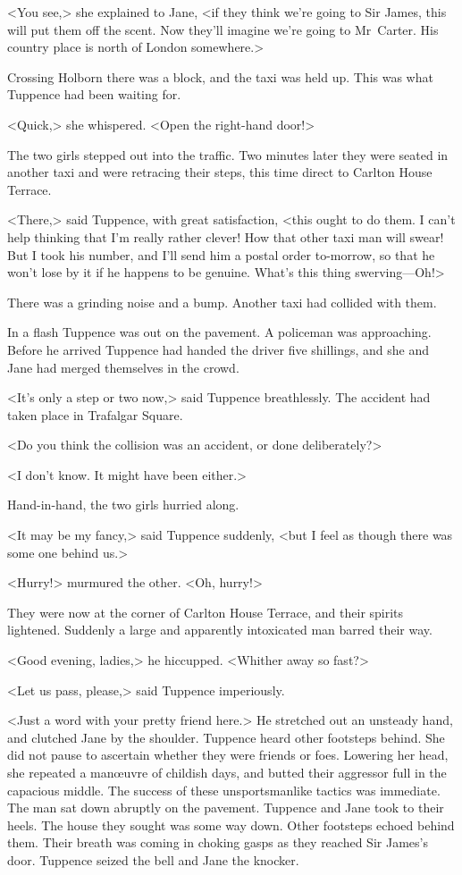 <You see,> she explained to Jane, <if they think we're going to Sir James, this will put them off the scent. Now they'll imagine we're going to Mr~Carter. His country place is north of London somewhere.>

Crossing Holborn there was a block, and the taxi was held up. This was what Tuppence had been waiting for.

<Quick,> she whispered. <Open the right-hand door!>

The two girls stepped out into the traffic. Two minutes later they were seated in another taxi and were retracing their steps, this time direct to Carlton House Terrace.

<There,> said Tuppence, with great satisfaction, <this ought to do them. I can't help thinking that I'm really rather clever! How that other taxi man will swear! But I took his number, and I'll send him a postal order to-morrow, so that he won't lose by it if he happens to be genuine. What's this thing swerving—Oh!>

There was a grinding noise and a bump. Another taxi had collided with them.

In a flash Tuppence was out on the pavement. A policeman was approaching. Before he arrived Tuppence had handed the driver five shillings, and she and Jane had merged themselves in the crowd.

<It's only a step or two now,> said Tuppence breathlessly. The accident had taken place in Trafalgar Square.

<Do you think the collision was an accident, or done deliberately?>

<I don't know. It might have been either.>

Hand-in-hand, the two girls hurried along.

<It may be my fancy,> said Tuppence suddenly, <but I feel as though there was some one behind us.>

<Hurry!> murmured the other. <Oh, hurry!>

They were now at the corner of Carlton House Terrace, and their spirits lightened. Suddenly a large and apparently intoxicated man barred their way.

<Good evening, ladies,> he hiccupped. <Whither away so fast?>

<Let us pass, please,> said Tuppence imperiously.

<Just a word with your pretty friend here.> He stretched out an unsteady hand, and clutched Jane by the shoulder. Tuppence heard other footsteps behind. She did not pause to ascertain whether they were friends or foes. Lowering her head, she repeated a manœuvre of childish days, and butted their aggressor full in the capacious middle. The success of these unsportsmanlike tactics was immediate. The man sat down abruptly on the pavement. Tuppence and Jane took to their heels. The house they sought was some way down. Other footsteps echoed behind them. Their breath was coming in choking gasps as they reached Sir James's door. Tuppence seized the bell and Jane the knocker.

